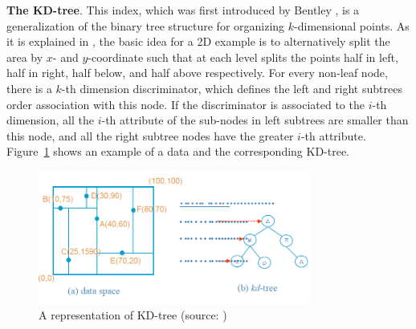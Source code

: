 \documentclass[a4paper,12pt]{article}
\begin{document}
\textbf{The KD-tree}.
This index, which was first introduced by Bentley \cite{bently1975}, is a generalization of the binary tree structure for organizing $k$-dimensional points. As it is explained in \cite{bently1975}, the basic idea for a 2D example is to alternatively split the area by $x$- and $y$-coordinate such that at each level splits the points half in left, half in right, half below, and half above respectively. For every non-leaf node, there is a $k$-th dimension discriminator, which defines the left and right subtrees order association with this node. If the discriminator is associated to the $i$-th dimension, all the $i$-th attribute of the sub-nodes in left subtrees are smaller than this node, and all the right subtree nodes have the greater $i$-th attribute. Figure~\ref{figkdtree} shows an example of a data and the corresponding KD-tree.

\begin{figure}
\centering
\includegraphics[width=0.8\textwidth]{kdtree}
\caption{A representation of KD-tree (source: \cite{bently1975})}
\label{figkdtree}
\end{figure}
\end{document}
